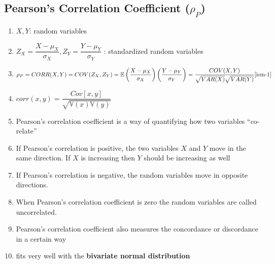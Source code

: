 \subsection{Pearson’s Correlation Coefficient ($\rho_P$) \cite{ism-1,mfml-1}} \label{Multivariate Distributions: Pearson’s Correlation Coefficient}

\begin{enumerate}
    \item[] $X,Y$: random variables
    
    \vspace{0.1cm}
    \item[] $
        Z_X = \dfrac{X - \mu_X}{\sigma_X},
        Z_Y = \dfrac{Y - \mu_Y}{\sigma_Y}
    $ : standardized random variables

    \vspace{0.2cm}
    
    \item[] 
    \[
        \rho_P 
        = CORR(X,Y)
        = COV(Z_X, Z_Y)
        = \mathbb{E}\left( \dfrac{X - \mu_X}{\sigma_X} \right) \left( \dfrac{Y - \mu_Y}{\sigma_Y} \right)
        = \dfrac{COV(X,Y)}{\sqrt{VAR(X)} \sqrt{VAR(Y)}}
        \hfill \text{\cite{ism-1}}
    \]
    
    \item[] $
        corr(x,y)
        = \dfrac{Cov[x,y]}{\sqrt{\mathbb{V}(x) \mathbb{V}(y)}}
    $ \hfill \cite{mfml-1}
    
    \vspace{0.2cm}
    
    \item Pearson’s correlation coefficient is a way of quantifying how two variables “co-relate”

    \item If Pearson’s correlation is positive, the two variables $X$ and $Y$ move in the same direction. If $X$ is increasing then $Y$ should be increasing as well

    \item If Pearson’s correlation is negative, the random variables move in opposite directions.

    \item When Pearson’s correlation coefficient is zero the random variables are called uncorrelated.

    \item Pearson’s correlation coefficient also measures the concordance or discordance in a certain way

    \item fits very well with the \textbf{bivariate normal distribution}


\end{enumerate}
